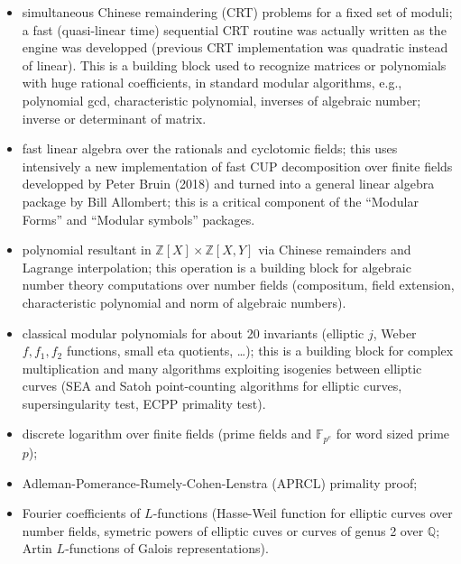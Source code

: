 \documentclass{deliverablereport}
\begin{document}
\begin{itemize}
\item simultaneous Chinese remaindering (CRT) problems for a fixed set of
  moduli; a fast (quasi-linear time) sequential CRT routine was actually
  written as the engine was developped (previous CRT implementation was
  quadratic instead of linear). This is a building block used to recognize
  matrices or polynomials with huge rational coefficients, in standard
  modular algorithms, e.g., polynomial gcd, characteristic polynomial,
  inverses of algebraic number; inverse or determinant of matrix.

\item fast linear algebra over the rationals and cyclotomic fields; this uses
  intensively a new implementation of fast CUP decomposition over finite
  fields developped by Peter Bruin (2018) and turned into a general linear
  algebra package by Bill Allombert; this is a critical component of
  the ``Modular Forms'' and ``Modular symbols'' packages.

\item polynomial resultant in $\mathbb{Z}[X] \times \mathbb{Z}[X,Y]$
  via Chinese remainders and Lagrange interpolation; this operation is a
  building block for algebraic number theory computations over number
  fields (compositum, field extension, characteristic polynomial and norm
  of algebraic numbers).

\item classical modular polynomials for about 20 invariants
  (elliptic $j$, Weber $f,f_1,f_2$ functions, small eta quotients, \dots);
    this is a building block for complex multiplication and many algorithms
    exploiting isogenies between elliptic curves (SEA and Satoh point-counting
    algorithms for elliptic curves, supersingularity test, ECPP primality test).

\item discrete logarithm over finite fields (prime fields and
  $\mathbb{F}_{p^e}$ for word sized prime $p$);

\item Adleman-Pomerance-Rumely-Cohen-Lenstra (APRCL) primality proof;

\item Fourier coefficients of $L$-functions (Hasse-Weil function for
  elliptic curves over number fields, symetric powers of elliptic cuves or
  curves of genus 2 over $\mathbb{Q}$; Artin $L$-functions of Galois
  representations).
\end{itemize}
\end{document}
